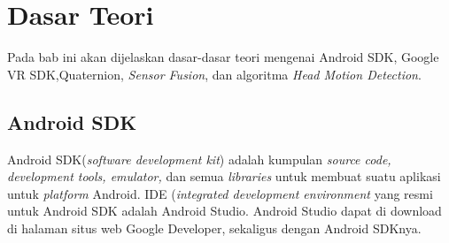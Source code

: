 \chapter{Dasar Teori}
\label{chap:dasar_teori}
Pada bab ini akan dijelaskan dasar-dasar teori mengenai Android SDK, Google VR SDK,Quaternion, \textit{Sensor Fusion}, dan algoritma \textit{Head Motion Detection}.

\section{Android SDK}
\label{sec:android_sdk}

Android SDK(\textit{software development kit}) adalah kumpulan \textit{source code, development tools, emulator,}\cite{developers2011android} dan semua \textit{libraries} untuk membuat suatu aplikasi untuk \textit{platform} Android. IDE (\textit{integrated development environment} yang resmi untuk Android SDK adalah Android Studio. Android Studio dapat di download di halaman situs web Google Developer\cite{developers2011android}, sekaligus dengan Android SDKnya.  

